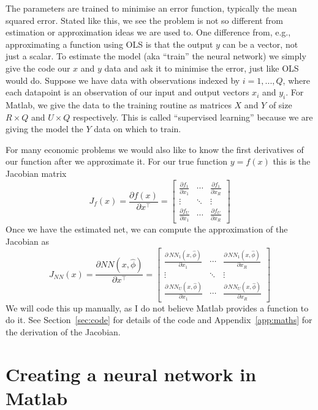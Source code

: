 \documentclass[a4paper,12pt]{article}
\newcommand{\sr}[1]{Section~\ref{sec:#1}}
\newcommand{\ar}[1]{Appendix~\ref{app:#1}}
\begin{document}
The parameters are trained to minimise an error function, typically the mean squared error. Stated like this, we see the problem is not so different from estimation or approximation ideas we are used to. One difference from, e.g., approximating a function using OLS is that the output $y$ can be a vector, not just a scalar. To estimate the model (aka ``train'' the neural network) we simply give the code our $x$ and $y$ data and ask it to minimise the error, just like OLS would do. Suppose we have data with observations indexed by $i = 1,...,Q$, where each datapoint is an observation of our input and output vectors $x_i$ and $y_i$. For Matlab, we give the data to the training routine as matrices $X$ and $Y$ of size $R \times Q$ and $U \times Q$ respectively. This is called ``supervised learning'' because we are giving the model the $Y$ data on which to train. 

For many economic problems we would also like to know the first derivatives of our function after we approximate it. For our true function $y=f(x)$ this is the Jacobian matrix 
\[
J_f(x) = \frac{\partial f(x)}{\partial x^\top} =
\begin{bmatrix}
\frac{\partial f_1}{\partial x_1} & \cdots & \frac{\partial f_1}{\partial x_R} \\
\vdots & \ddots & \vdots \\
\frac{\partial f_U}{\partial x_1} & \cdots & \frac{\partial f_U}{\partial x_R}
\end{bmatrix}
\]
Once we have the estimated net, we can compute the approximation of the Jacobian as
\[
J_{NN}(x) = \frac{\partial {NN}(x,\hat\phi)}{\partial x^\top} =
\begin{bmatrix}
\frac{\partial\, NN_1(x, \hat{\phi})}{\partial x_1} & \cdots & \frac{\partial\, NN_1(x, \hat{\phi})}{\partial x_R} \\
\vdots & \ddots & \vdots \\
\frac{\partial\, NN_U(x, \hat{\phi})}{\partial x_1} & \cdots & \frac{\partial\, NN_U(x, \hat{\phi})}{\partial x_R}
\end{bmatrix}
\]
We will code this up manually, as I do not believe Matlab provides a function to do it. See \sr{code} for details of the code and \ar{maths} for the derivation of the Jacobian. 

\section{Creating a neural network in Matlab}
\end{document}
